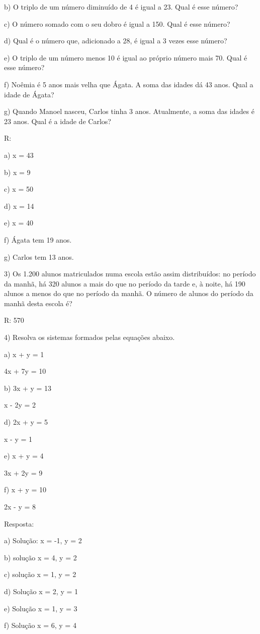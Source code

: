 b) O triplo de um número diminuído de 4 é igual a 23. Qual é esse
número?

c) O número somado com o seu dobro é igual a 150. Qual é esse número?

d) Qual é o número que, adicionado a 28, é igual a 3 vezes esse número?

e) O triplo de um número menos 10 é igual ao próprio número mais 70.
Qual é esse número?

f) Noêmia é 5 anos mais velha que Ágata. A soma das idades dá 43 anos.
Qual a idade de Ágata?

g) Quando Manoel nasceu, Carlos tinha 3 anos. Atualmente, a soma das
idades é 23 anos. Qual é a idade de Carlos?

R:

a) x = 43

b) x = 9

c) x = 50

d) x = 14

e) x = 40

f) Ágata tem 19 anos.

g) Carlos tem 13 anos.

3) Os 1.200 alunos matriculados numa escola estão assim distribuídos: no
período da manhã, há 320 alunos a mais do que no período da tarde e, à
noite, há 190 alunos a menos do que no período da manhã. O número de
alunos do período da manhã desta escola é?

R: 570

4) Resolva os sistemas formados pelas equações abaixo.

a) x + y = 1

4x + 7y = 10

b) 3x + y = 13

x - 2y = 2

d) 2x + y = 5

x - y = 1

e) x + y = 4

3x + 2y = 9

f) x + y = 10

2x - y = 8

Resposta:

a) Solução: x = -1, y = 2

b) solução x = 4, y = 2

c) solução x = 1, y = 2

d) Solução x = 2, y = 1

e) Solução x = 1, y = 3

f) Solução x = 6, y = 4

